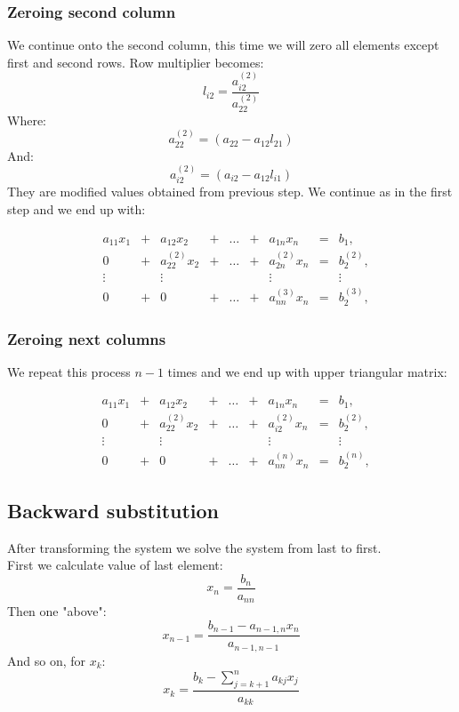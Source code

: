 \documentclass[12pt]{report}
\begin{document}
\subsubsection{Zeroing second column}
We continue onto the second column, this time we will zero all elements except first and second rows.
Row multiplier becomes:
\[ l_{i2} = \frac{ a_{i2}^{(2)} }{ a_{22}^{(2)} } \]
Where:
\[ a_{22}^{(2)} = (a_{22} - a_{12}l_{21}) \]
And:
\[ a_{i2}^{(2)} = (a_{i2} - a_{12}l_{i1}) \]
\newpage
They are modified values obtained from previous step.
We continue as in the first step and we end up with:

\[
\begin{matrix}

&a_{11}x_1 &{}+&a_{12}x_2&+&\dots&+&a_{1n}x_n &=&b_1,\\

&0 &{}+& a_{22}^{(2)}x_2&{}+&\dots&{}+& a_{2n}^{(2)}x_n &=&b_2^{(2)},\\

&\vdots    &&\vdots      & &     & &  \vdots  & &\vdots\\

&0 &{}+& 0 &{}+&\dots&{}+& a_{nn}^{(3)}x_n &=&b_2^{(3)},

\end{matrix}
\]

\subsubsection{Zeroing next columns}
We repeat this process $n-1$ times and we end up with upper triangular matrix:

\[
\begin{matrix}

&a_{11}x_1 &{}+&a_{12}x_2&+&\dots&+&a_{1n}x_n &=&b_1,\\

&0 &{}+& a_{22}^{(2)}x_2&{}+&\dots&{}+& a_{i2}^{(2)}x_n &=&b_2^{(2)},\\

&\vdots    &&\vdots      & &     & &  \vdots  & &\vdots\\

&0 &{}+& 0 &{}+&\dots&{}+& a_{nn}^{(n)}x_n &=&b_2^{(n)},

\end{matrix}
\]

\subsection{Backward substitution}
After transforming the system we solve the system from last to first. \\
First we calculate value of last element:
\[ x_n = \frac{b_n}{a_{nn}} \]
Then one "above":
\[ x_{n-1} = \frac{ b_{n-1} - a_{n-1, n}x_n}{a_{n-1, n-1}} \]
And so on, for $x_k$:
\[ x_{k} = \frac{b_k - \sum_{j = k + 1}^n a_{kj}x_j}{a_{kk}} \]
\end{document}
